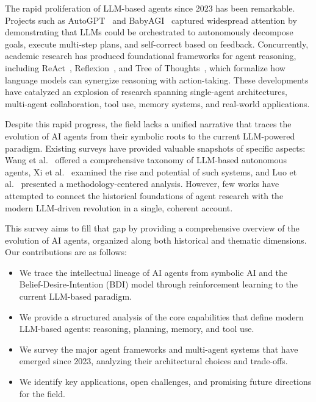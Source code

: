 \documentclass[11pt,a4paper]{article}
\begin{document}
The rapid proliferation of LLM-based agents since 2023 has been remarkable. Projects such as AutoGPT~\citep{autogpt2023} and BabyAGI~\citep{babyagi2023} captured widespread attention by demonstrating that LLMs could be orchestrated to autonomously decompose goals, execute multi-step plans, and self-correct based on feedback. Concurrently, academic research has produced foundational frameworks for agent reasoning, including ReAct~\citep{yao2023react}, Reflexion~\citep{shinn2024reflexion}, and Tree of Thoughts~\citep{yao2024tree}, which formalize how language models can synergize reasoning with action-taking. These developments have catalyzed an explosion of research spanning single-agent architectures, multi-agent collaboration, tool use, memory systems, and real-world applications.

Despite this rapid progress, the field lacks a unified narrative that traces the evolution of AI agents from their symbolic roots to the current LLM-powered paradigm. Existing surveys have provided valuable snapshots of specific aspects: Wang et al.~\citep{wang2024survey} offered a comprehensive taxonomy of LLM-based autonomous agents, Xi et al.~\citep{xi2023rise} examined the rise and potential of such systems, and Luo et al.~\citep{luo2025methodology} presented a methodology-centered analysis. However, few works have attempted to connect the historical foundations of agent research with the modern LLM-driven revolution in a single, coherent account.

This survey aims to fill that gap by providing a comprehensive overview of the evolution of AI agents, organized along both historical and thematic dimensions. Our contributions are as follows:

\begin{itemize}
    \item We trace the intellectual lineage of AI agents from symbolic AI and the Belief-Desire-Intention (BDI) model through reinforcement learning to the current LLM-based paradigm.
    \item We provide a structured analysis of the core capabilities that define modern LLM-based agents: reasoning, planning, memory, and tool use.
    \item We survey the major agent frameworks and multi-agent systems that have emerged since 2023, analyzing their architectural choices and trade-offs.
    \item We identify key applications, open challenges, and promising future directions for the field.
\end{itemize}
\end{document}
